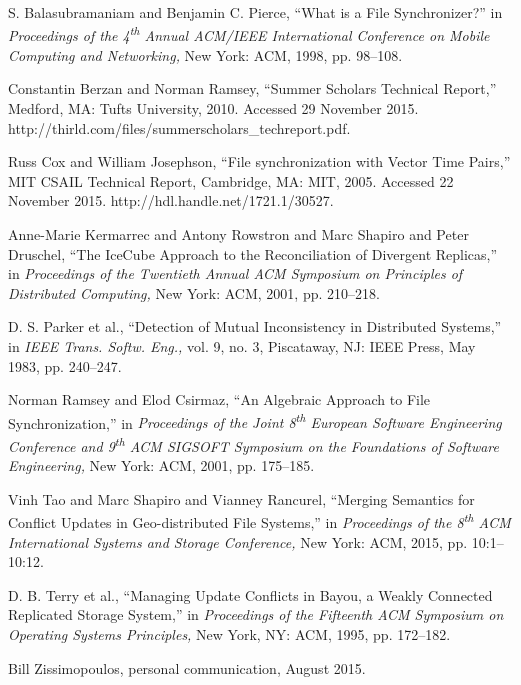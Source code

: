 
S. Balasubramaniam and Benjamin C. Pierce,
``What is a File Synchronizer?''
in \emph{Proceedings of the 4\textsuperscript{th} Annual 
ACM/IEEE International Conference on Mobile Computing and Networking,}
New York: ACM, 1998, pp. 98--108.

Constantin Berzan and Norman Ramsey,
``Summer Scholars Technical Report,''
Medford, MA: Tufts University, 2010.
Accessed 29 November 2015.
http://thirld.com/files/summerscholars\_techreport.pdf.

Russ Cox and William Josephson,
``File synchronization with Vector Time Pairs,''
MIT CSAIL Technical Report,
Cambridge, MA: MIT,
2005.
Accessed 22 November 2015.
http://hdl.handle.net/1721.1/30527.

Anne-Marie Kermarrec and Antony Rowstron and Marc Shapiro and Peter Druschel,
``The IceCube Approach to the Reconciliation of Divergent Replicas,''
in \emph{Proceedings of the Twentieth Annual ACM Symposium on Principles of Distributed Computing,}
New York: ACM, 2001, pp. 210--218.

D. S. Parker et al.,
``Detection of Mutual Inconsistency in Distributed Systems,''
in \emph{IEEE Trans. Softw. Eng.,}
vol. 9, no. 3,
Piscataway, NJ: IEEE Press,
May 1983,
pp. 240--247.

Norman Ramsey and Elod Csirmaz,
``An Algebraic Approach to File Synchronization,''
in \emph{Proceedings of the Joint 8\textsuperscript{th} European Software Engineering Conference 
and 9\textsuperscript{th} ACM SIGSOFT Symposium on the Foundations of Software Engineering,}
New York: ACM, 2001, pp. 175--185.

Vinh Tao and Marc Shapiro and Vianney Rancurel,
``Merging Semantics for Conflict Updates in Geo-distributed File Systems,''
in \emph{Proceedings of the 8\textsuperscript{th}
 ACM International Systems and Storage Conference,}
New York: ACM, 2015, pp. 10:1--10:12.

D. B. Terry et al.,
``Managing Update Conflicts in Bayou, a Weakly Connected Replicated Storage System,''
in \emph{Proceedings of the Fifteenth ACM Symposium on Operating Systems Principles,}
New York, NY: ACM, 1995, pp. 172--182.

Bill Zissimopoulos, personal communication, August 2015.

